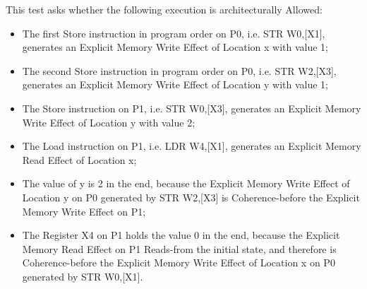 This test asks whether the following execution is architecturally Allowed:

\begin{itemize}
  \item The first Store instruction in program order on P0, i.e. STR W0,[X1], generates an Explicit Memory Write Effect of Location x with value 1;
  \item The second Store instruction in program order on P0, i.e. STR W2,[X3], generates an Explicit Memory Write Effect of Location y with value 1;
  \item The Store instruction on P1, i.e. STR W0,[X3], generates an Explicit Memory Write Effect of Location y with value 2;
  \item The Load instruction on P1, i.e. LDR W4,[X1], generates an Explicit Memory Read Effect of Location x;
  \item The value of y is 2 in the end, because the Explicit Memory Write Effect of Location y on P0 generated by STR W2,[X3] is Coherence-before the Explicit Memory Write Effect on P1;
  \item The Register X4 on P1 holds the value 0 in the end, because the Explicit Memory Read Effect on P1 Reads-from the initial state, and therefore is Coherence-before the Explicit Memory Write Effect of Location x on P0 generated by STR W0,[X1].
\end{itemize}
